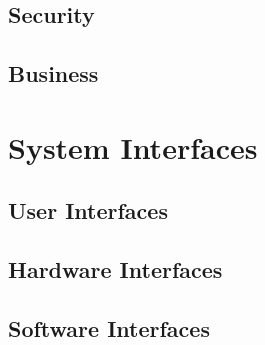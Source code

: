 \subsection{Security}
\subsection{Business}
\section{System Interfaces}
\subsection{User Interfaces}
\subsection{Hardware Interfaces}
\subsection{Software Interfaces}